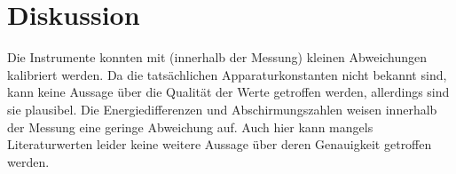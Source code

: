 \section{Diskussion}
\label{sec:Diskussion}

Die Instrumente konnten mit (innerhalb der Messung) kleinen Abweichungen kalibriert werden. Da die tatsächlichen Apparaturkonstanten nicht bekannt sind, kann keine Aussage über die Qualität der Werte getroffen werden, allerdings sind sie plausibel. Die Energiedifferenzen und Abschirmungszahlen weisen innerhalb der Messung eine geringe Abweichung auf. Auch hier kann mangels Literaturwerten leider keine weitere Aussage über deren Genauigkeit getroffen werden.
